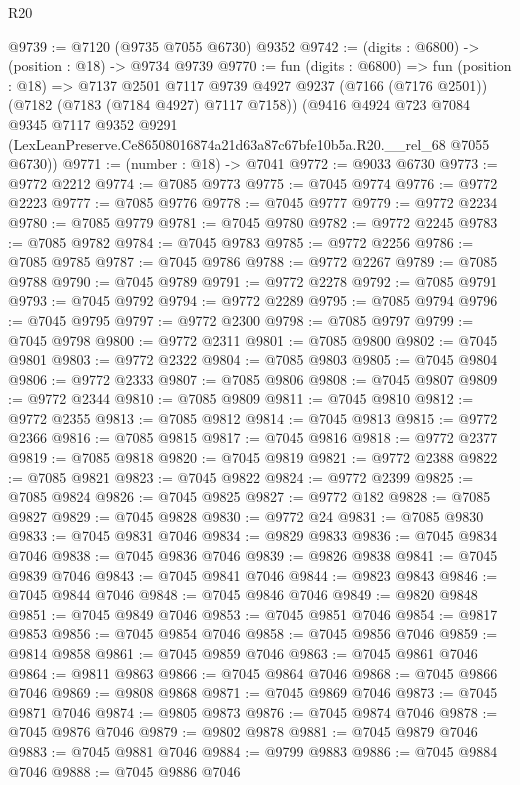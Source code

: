 \begin{lexlean}{R20}
\begin{coremodule}
{@9739 := @7120 (@9735 @7055 @6730) @9352
@9742 := (digits : @6800) -> (position : @18) -> @9734 @9739
@9770 := fun (digits : @6800) =>
  fun (position : @18) =>
  @7137
    @2501
    @7117
    @9739
    @4927
    @9237
    (@7166 (@7176 @2501))
    (@7182 (@7183 (@7184 @4927) @7117 @7158))
    (@9416
      @4924
      @723
      @7084
      @9345
      @7117
      @9352
      @9291
      (LexLeanPreserve.Ce86508016874a21d63a87c67bfe10b5a.R20.__rel_68 @7055 @6730))
@9771 := (number : @18) -> @7041
@9772 := @9033 @6730
@9773 := @9772 @2212
@9774 := @7085 @9773
@9775 := @7045 @9774
@9776 := @9772 @2223
@9777 := @7085 @9776
@9778 := @7045 @9777
@9779 := @9772 @2234
@9780 := @7085 @9779
@9781 := @7045 @9780
@9782 := @9772 @2245
@9783 := @7085 @9782
@9784 := @7045 @9783
@9785 := @9772 @2256
@9786 := @7085 @9785
@9787 := @7045 @9786
@9788 := @9772 @2267
@9789 := @7085 @9788
@9790 := @7045 @9789
@9791 := @9772 @2278
@9792 := @7085 @9791
@9793 := @7045 @9792
@9794 := @9772 @2289
@9795 := @7085 @9794
@9796 := @7045 @9795
@9797 := @9772 @2300
@9798 := @7085 @9797
@9799 := @7045 @9798
@9800 := @9772 @2311
@9801 := @7085 @9800
@9802 := @7045 @9801
@9803 := @9772 @2322
@9804 := @7085 @9803
@9805 := @7045 @9804
@9806 := @9772 @2333
@9807 := @7085 @9806
@9808 := @7045 @9807
@9809 := @9772 @2344
@9810 := @7085 @9809
@9811 := @7045 @9810
@9812 := @9772 @2355
@9813 := @7085 @9812
@9814 := @7045 @9813
@9815 := @9772 @2366
@9816 := @7085 @9815
@9817 := @7045 @9816
@9818 := @9772 @2377
@9819 := @7085 @9818
@9820 := @7045 @9819
@9821 := @9772 @2388
@9822 := @7085 @9821
@9823 := @7045 @9822
@9824 := @9772 @2399
@9825 := @7085 @9824
@9826 := @7045 @9825
@9827 := @9772 @182
@9828 := @7085 @9827
@9829 := @7045 @9828
@9830 := @9772 @24
@9831 := @7085 @9830
@9833 := @7045 @9831 @7046
@9834 := @9829 @9833
@9836 := @7045 @9834 @7046
@9838 := @7045 @9836 @7046
@9839 := @9826 @9838
@9841 := @7045 @9839 @7046
@9843 := @7045 @9841 @7046
@9844 := @9823 @9843
@9846 := @7045 @9844 @7046
@9848 := @7045 @9846 @7046
@9849 := @9820 @9848
@9851 := @7045 @9849 @7046
@9853 := @7045 @9851 @7046
@9854 := @9817 @9853
@9856 := @7045 @9854 @7046
@9858 := @7045 @9856 @7046
@9859 := @9814 @9858
@9861 := @7045 @9859 @7046
@9863 := @7045 @9861 @7046
@9864 := @9811 @9863
@9866 := @7045 @9864 @7046
@9868 := @7045 @9866 @7046
@9869 := @9808 @9868
@9871 := @7045 @9869 @7046
@9873 := @7045 @9871 @7046
@9874 := @9805 @9873
@9876 := @7045 @9874 @7046
@9878 := @7045 @9876 @7046
@9879 := @9802 @9878
@9881 := @7045 @9879 @7046
@9883 := @7045 @9881 @7046
@9884 := @9799 @9883
@9886 := @7045 @9884 @7046
@9888 := @7045 @9886 @7046
}
\end{coremodule}
\end{lexlean}
